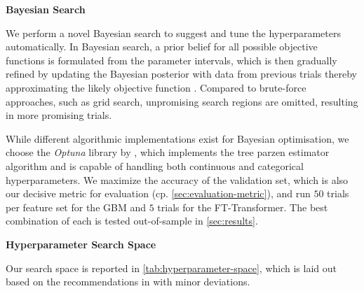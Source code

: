 \textbf{Bayesian Search}

We perform a novel Bayesian search to suggest and tune the hyperparameters automatically. In Bayesian search, a prior belief for all possible objective functions is formulated from the parameter intervals, which is then gradually refined by updating the Bayesian posterior with data from previous trials thereby approximating the likely objective function \autocite[][2]{shahriariTakingHumanOut2016}. Compared to brute-force approaches, such as grid search, unpromising search regions are omitted, resulting in more promising trials.

While different algorithmic implementations exist for Bayesian optimisation, we choose the \emph{Optuna} library by \textcite[][1--10]{akibaOptunaNextgenerationHyperparameter2019}, which implements the tree parzen estimator algorithm and is capable of handling both continuous and categorical hyperparameters. We maximize the accuracy of the validation set, which is also our decisive metric for evaluation (cp. \cref{sec:evaluation-metric}), and run $50$ trials per feature set for the \gls{GBM} and $5$ trials for the FT-Transformer. The best combination of each is tested out-of-sample in \cref{sec:results}.

\textbf{Hyperparameter Search Space}

Our search space is reported in \cref{tab:hyperparameter-space}, which is laid out based on the recommendations in \textcites[][20]{prokhorenkovaCatBoostUnbiasedBoosting2018}[][18]{gorishniyRevisitingDeepLearning2021}[][4]{rubachevRevisitingPretrainingObjectives2022} with minor deviations.

